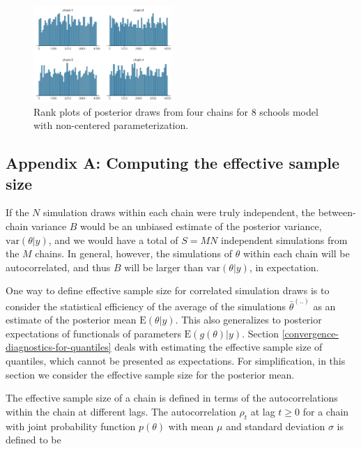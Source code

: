 \documentclass[american,]{article}
\theoremstyle{definition}
\begin{document}
\begin{figure}[tp]
  \centering
  \includegraphics[width=0.47\textwidth]{graphics/hist-fit-ncp2-1.pdf}
  \caption{Rank plots of posterior draws from four chains for 8 schools model with non-centered parameterization.}
  \label{fig:hist-fit-ncp2-1}
\end{figure}


\hypertarget{refs}{}



\newpage
\hypertarget{ESS}{%
\subsection*{Appendix A: Computing the effective sample size}\label{ESS}}

If the \(N\) simulation draws within each chain were truly independent,
the between-chain variance \(B\) would be an unbiased estimate of the
posterior variance, \(\mbox{var}(\theta | y)\), and we would have a
total of \(S = MN\) independent simulations from the \(M\) chains. In
general, however, the simulations of \(\theta\) within each chain will
be autocorrelated, and thus \(B\) will be larger than
\(\mbox{var}(\theta | y)\), in expectation.

One way to define effective sample size for correlated simulation draws
is to consider the statistical efficiency of the average of the
simulations \(\bar{\theta}^{(..)}\) as an estimate of the posterior mean
\(\mbox{E}(\theta | y)\). This also generalizes to posterior
expectations of functionals of parameters \(\mbox{E}\left(g(\theta) | y\right)\).
Section \ref{convergence-diagnostics-for-quantiles} deals with 
estimating the effective sample size of
quantiles, which cannot be presented as expectations. For simplification,
in this section we consider the effective sample size for the posterior
mean.

The effective sample size of a chain is defined in terms of the
autocorrelations within the chain at different lags. The autocorrelation
\(\rho_t\) at lag \(t \geq 0\) for a chain with joint probability
function \(p(\theta)\) with mean \(\mu\) and standard deviation \(\sigma\) is
defined to be
\end{document}
